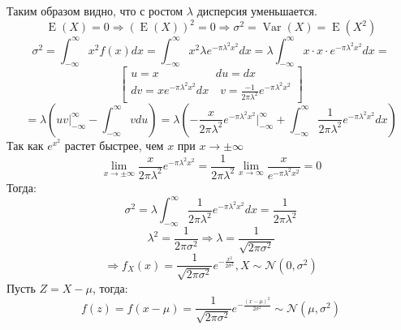 \documentclass[12pt,a4paper]{article}
\DeclareMathOperator{\Var}{Var}
\DeclareMathOperator{\E}{E}
\begin{document}
Таким образом видно, что с ростом $\lambda$ дисперсия уменьшается.
\[\E(X)=0 \Rightarrow (\E(X))^2=0 \Rightarrow \sigma^2=\Var(X)=\E(X^2) \]
\[\sigma^2 = \displaystyle \int_{-\infty}^{\infty} x^2 f(x) dx = 
\displaystyle \int_{-\infty}^{\infty} x^2 \lambda e^{-\pi{\lambda}^2x^2}  dx =
	\lambda \displaystyle \int_{-\infty}^{\infty} x\cdot x \cdot e^{-\pi{\lambda}^2x^2} dx =\]
\[ 
\left[\begin{matrix} u=x \quad \quad \quad \quad \quad du=dx\\ dv= x e^{-\pi{\lambda}^2x^2} dx \quad v=\frac{-1}{2\pi\lambda^2}e^{-\pi{\lambda}^2x^2}\end{matrix}\right]
\]
\[=\lambda \left( uv \bigg|_{-\infty}^{\infty}- \displaystyle \int_{-\infty}^{\infty} vdu \right) = \lambda \left( -\frac{x}{2\pi\lambda^2}e^{-\pi{\lambda}^2x^2} \bigg|_{-\infty}^{\infty} + \displaystyle \int_{-\infty}^{\infty} \frac{1}{2\pi\lambda^2}e^{-\pi{\lambda}^2x^2} dx \right)\]
Так как $e^{x^2}$ растет быстрее, чем $x$ при $x \rightarrow \pm \infty$
\[\lim\limits_{x\to \pm \infty} \frac{x}{2\pi\lambda^2}e^{-\pi{\lambda}^2x^2} = 
\frac{1}{2\pi\lambda^2}\lim\limits_{x\to\infty} \frac{x}{ e^{-\pi{\lambda}^2x^2}}=0\]
Тогда:
\[\sigma^2 = \lambda \displaystyle \int_{-\infty}^{\infty} \frac{1}{2\pi\lambda^2}e^{-\pi{\lambda}^2x^2} dx = \dfrac{1}{2\pi\lambda^2} \]
\[\lambda^2 = \dfrac{1}{2\pi\sigma^2} \Rightarrow \lambda = \dfrac{1}{\sqrt{2\pi\sigma^2}} \]
\[\Rightarrow f_X(x)=\dfrac{1}{\sqrt{2\pi\sigma^2}} e ^ {-\frac{x^2}{2\sigma^2}}, X \sim \mathcal{N}(0, \sigma^2)\]
Пусть $Z=X-\mu$, тогда:
\[f(z)=f(x-\mu)=\dfrac{1}{\sqrt{2\pi\sigma^2}} e ^ {-\frac{(x-\mu)^2}{2\sigma^2}} \sim \mathcal{N}(\mu, \sigma^2)\]
\vspace{0.4 in} 
\\

	\begin{tikzpicture}
		
	\end{tikzpicture}
\end{document}
